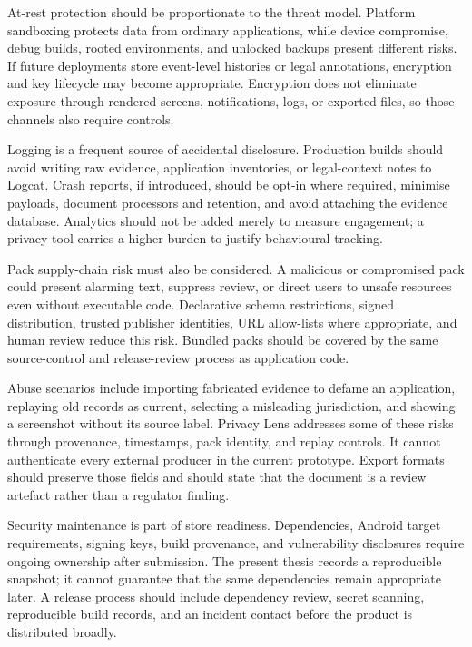 At-rest protection should be proportionate to the threat model. Platform sandboxing protects data from ordinary applications, while device compromise, debug builds, rooted environments, and unlocked backups present different risks. If future deployments store event-level histories or legal annotations, encryption and key lifecycle may become appropriate. Encryption does not eliminate exposure through rendered screens, notifications, logs, or exported files, so those channels also require controls.

Logging is a frequent source of accidental disclosure. Production builds should avoid writing raw evidence, application inventories, or legal-context notes to Logcat. Crash reports, if introduced, should be opt-in where required, minimise payloads, document processors and retention, and avoid attaching the evidence database. Analytics should not be added merely to measure engagement; a privacy tool carries a higher burden to justify behavioural tracking.

Pack supply-chain risk must also be considered. A malicious or compromised pack could present alarming text, suppress review, or direct users to unsafe resources even without executable code. Declarative schema restrictions, signed distribution, trusted publisher identities, URL allow-lists where appropriate, and human review reduce this risk. Bundled packs should be covered by the same source-control and release-review process as application code.

Abuse scenarios include importing fabricated evidence to defame an application, replaying old records as current, selecting a misleading jurisdiction, and showing a screenshot without its source label. Privacy Lens addresses some of these risks through provenance, timestamps, pack identity, and replay controls. It cannot authenticate every external producer in the current prototype. Export formats should preserve those fields and should state that the document is a review artefact rather than a regulator finding.

Security maintenance is part of store readiness. Dependencies, Android target requirements, signing keys, build provenance, and vulnerability disclosures require ongoing ownership after submission. The present thesis records a reproducible snapshot; it cannot guarantee that the same dependencies remain appropriate later. A release process should include dependency review, secret scanning, reproducible build records, and an incident contact before the product is distributed broadly.

